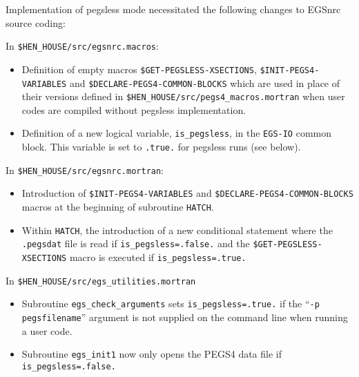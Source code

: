 Implementation of pegsless mode necessitated the following changes to EGSnrc source coding:
\begin{description}
\item In {\tt \$HEN\_HOUSE/src/egsnrc.macros}:
\begin{itemize}
\item Definition of empty macros {\tt \$GET-PEGSLESS-XSECTIONS}, {\tt \$INIT-PEGS4-VARIABLES} and {\tt \$DECLARE-PEGS4-COMMON-BLOCKS}
which are used in place of their versions defined in {\tt \$HEN\_HOUSE/src/pegs4\_macros.mortran} when user codes are compiled
without pegsless implementation.
\item Definition of a new logical variable, {\tt is\_pegsless}, in the {\tt EGS-IO} common block.  This variable is set to {\tt .true.}
for pegsless runs (see below).
\end{itemize}
\item In {\tt \$HEN\_HOUSE/src/egsnrc.mortran}:
\begin{itemize}
\item Introduction of {\tt \$INIT-PEGS4-VARIABLES} and {\tt \$DECLARE-PEGS4-COMMON-BLOCKS} macros at the beginning of
subroutine {\tt HATCH}.
\item Within {\tt HATCH}, the introduction of a new conditional statement where
the {\tt .pegsdat} file is read if {\tt is\_pegsless=.false.} and the {\tt \$GET-PEGSLESS-XSECTIONS} macro
is executed if {\tt is\_pegsless=.true.}
\end{itemize}
\item In {\tt \$HEN\_HOUSE/src/egs\_utilities.mortran}
\begin{itemize}
\item Subroutine {\tt egs\_check\_arguments} sets {\tt is\_pegsless=.true.} if the
``{\tt -p pegsfilename}'' argument is not supplied on the command line when running a user code.
\item Subroutine {\tt egs\_init1} now only opens the PEGS4 data file if {\tt is\_pegsless=.false.}
\end{itemize}
\end{description} 
